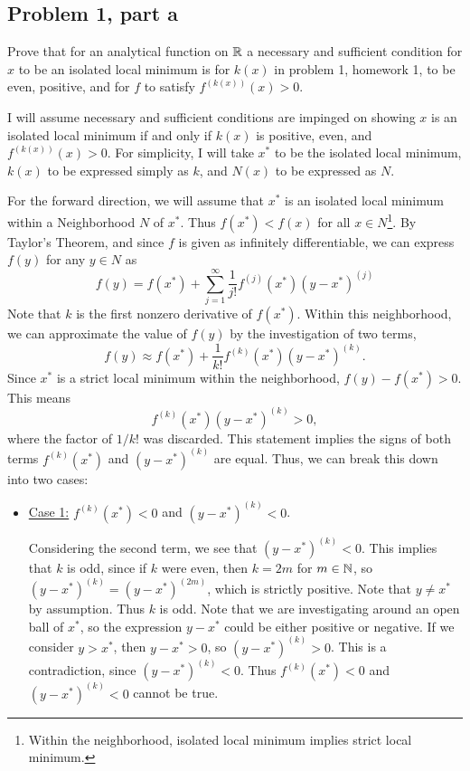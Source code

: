 \subsection{Problem 1, part a}
Prove that for an analytical function on $\mathbb{R}$ a necessary and sufficient condition for $x$ to be an isolated local minimum is for $k(x)$ in problem 1, homework 1, to be even, positive, and for $f$ to satisfy $f^{(k(x))}(x) > 0$.
\partbreak
\begin{solution}

    I will assume necessary and sufficient conditions are impinged on showing $x$ is an isolated local minimum if and only if $k(x)$ is positive, even, and $f^{(k(x))}(x) > 0$. For simplicity, I will take $x^*$ to be the isolated local minimum, $k(x)$ to be expressed simply as $k$, and $N(x)$ to be expressed as $N$. \par

    \jump 
    For the forward direction, we will assume that $x^*$ is an isolated local minimum within a Neighborhood $N$ of $x^*$. Thus $f(x^*) < f(x)$ for all $x \in N$\footnote{Within the neighborhood, isolated local minimum implies strict local minimum.}. By Taylor's Theorem, and since $f$ is given as infinitely differentiable, we can express $f(y)$ for any $y \in N$ as
    \[f(y) = f(x^*) + \sum_{j = 1}^\infty \frac{1}{j!}f^{(j)}(x^*)(y - x^*)^{(j)}\]
    Note that $k$ is the first nonzero derivative of $f(x^*)$. Within this neighborhood, we can approximate the value of $f(y)$ by the investigation of two terms, 
    \[f(y) \approx f(x^*) + \frac{1}{k!}f^{(k)}(x^*)(y - x^*)^{(k)}.\]
    Since $x^*$ is a strict local minimum within the neighborhood, $f(y) - f(x^*) > 0$. This means
    \[f^{(k)}(x^*)(y - x^*)^{(k)} > 0,\]
     where the factor of $1 / k!$ was discarded. This statement implies the signs of both terms $f^{(k)}(x^*)$ and $(y - x^*)^{(k)}$ are equal. Thus, we can break this down into two cases:

     \begin{itemize}
         \item \underline{Case 1:} $f^{(k)}(x^*) < 0$ and $(y - x^*)^{(k)} < 0$.
         
         \jump
         Considering the second term, we see that $(y - x^*)^{(k)} < 0$. This implies that $k$ is odd, since if $k$ were even, then $k = 2m$ for $m \in \mathbb{N}$, so $(y - x^*)^{(k)} = (y - x^*)^{(2m)}$, which is strictly positive. Note that $y \neq x^*$ by assumption. Thus $k$ is odd. Note that we are investigating around an open ball of $x^*$, so the expression $y - x^*$ could be either positive or negative. If we consider $y > x^*$, then $y - x^* > 0$, so $(y - x^*)^{(k)} > 0$. This is a contradiction, since $(y - x^*)^{(k)} < 0$. Thus $f^{(k)}(x^*) < 0$ and $(y - x^*)^{(k)} < 0$ cannot be true.


\end{itemize}
\end{solution}
